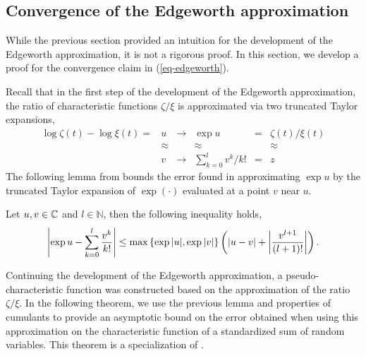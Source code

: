\subsection{Convergence of the Edgeworth approximation}

While the previous section provided an intuition for the development of the Edgeworth approximation, it is not a rigorous proof. In this section, we develop a proof for the convergence claim in (\ref{eq-edgeworth}).

Recall that in the first step of the development of the Edgeworth approximation, the ratio of characteristic functions $\zeta / \xi$ is approximated via two truncated Taylor expansions,
\begin{equation*}
    \begin{matrix}
        \log \zeta(t) - \log \xi(t) = & u & \longrightarrow & \exp u & = & \zeta(t) / \xi(t)\\
        &\approx & & \approx & & \approx \\
        &v  & \longrightarrow & \sum_{k=0}^l v^k/k! & = & z
    \end{matrix}
\end{equation*}
The following lemma from \cite[Theorem 2.5.3]{kolassa2006series} bounds the error found in approximating $\exp u$ by the truncated Taylor expansion of $\exp(\cdot)$ evaluated at a point $v$ near $u$.
\begin{lemma} \label{lemma-series}
    Let $u, v \in \mathbb{C}$ and $l \in \mathbb{N}$, then the following inequality holds,
    \begin{equation}
        \left|\exp{u} - \sum_{k=0}^l \frac{v^k}{k!}\right| \leq \max \left\{ \exp{|u|}, \exp{|v|} \right\}\left(\left|u - v\right| + \left|\frac{v^{l+1}}{(l+1)!}\right|\right).
    \end{equation}
\end{lemma}


Continuing the development of the Edgeworth approximation, a pseudo-characteristic function was constructed based on the approximation of the ratio $\zeta / \xi$. In the following theorem, we use the previous lemma and properties of cumulants to provide an asymptotic bound on the error obtained when using this approximation on the characteristic function of a standardized sum of random variables. This theorem is a specialization of \cite[Corollary 2.5.4]{kolassa2006series}.

